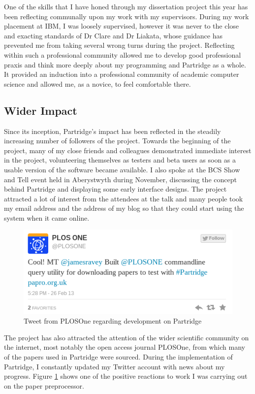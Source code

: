 One of the skills that I have honed through my dissertation project this year
has been reflecting communally upon my work with my supervisors. During my work
placement at IBM, I was loosely supervised, however it was never to the close
and exacting standards of Dr Clare and Dr Liakata, whose guidance has 
prevented me from taking several wrong turns during the project. Reflecting
within such a professional community allowed me to develop good professional
praxis and think more deeply about my programming and Partridge as a whole. It
provided an induction into a professional community of academic computer
science and allowed me, as a novice, to feel comfortable there. 


\subsection{Wider Impact}

Since its inception, Partridge's impact has been reflected in the steadily
increasing number of followers of the project. Towards the beginning of the
project, many of my close friends and colleagues demonstrated immediate
interest in the project, volunteering themselves as testers and beta users as
soon as a usable version of the software became available. I also spoke at the
BCS Show and Tell event held in Aberystwyth during November, discussing the
concept behind Partridge and displaying some early interface designs. The
project attracted a lot of interest from the attendees at the talk and many
people took my email address and the address of my blog so that they could
start using the system when it came online.

\begin{figure}[!h]
\centering
\includegraphics[width=\textwidth]{images/evaluation/plostweet.png}
\caption{Tweet from PLOSOne regarding development on Partridge}
\label{fig:plostweet}
\end{figure}

The project has also attracted the attention of the wider scientific community
on the internet, most notably the open access journal PLOSOne, from which many
of the papers used in Partridge were sourced. During the implementation of
Partridge, I constantly updated my Twitter account with news about my
progress. Figure \ref{fig:plostweet} shows one of the positive reactions to
work I was carrying out on the paper preprocessor.


